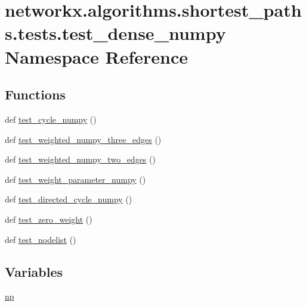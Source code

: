 \hypertarget{namespacenetworkx_1_1algorithms_1_1shortest__paths_1_1tests_1_1test__dense__numpy}{}\section{networkx.\+algorithms.\+shortest\+\_\+paths.\+tests.\+test\+\_\+dense\+\_\+numpy Namespace Reference}
\label{namespacenetworkx_1_1algorithms_1_1shortest__paths_1_1tests_1_1test__dense__numpy}
\subsection*{Functions}
\begin{DoxyCompactItemize}
\item 
def \hyperlink{namespacenetworkx_1_1algorithms_1_1shortest__paths_1_1tests_1_1test__dense__numpy_aaae6a644b378c13636ec77b107e6d745}{test\+\_\+cycle\+\_\+numpy} ()
\item 
def \hyperlink{namespacenetworkx_1_1algorithms_1_1shortest__paths_1_1tests_1_1test__dense__numpy_a06ad970350d4381cf18e387948069c8c}{test\+\_\+weighted\+\_\+numpy\+\_\+three\+\_\+edges} ()
\item 
def \hyperlink{namespacenetworkx_1_1algorithms_1_1shortest__paths_1_1tests_1_1test__dense__numpy_a3b48ca93c991f7dbdebabf7ea4900398}{test\+\_\+weighted\+\_\+numpy\+\_\+two\+\_\+edges} ()
\item 
def \hyperlink{namespacenetworkx_1_1algorithms_1_1shortest__paths_1_1tests_1_1test__dense__numpy_ae9db5554f475d7c812abf4722f004120}{test\+\_\+weight\+\_\+parameter\+\_\+numpy} ()
\item 
def \hyperlink{namespacenetworkx_1_1algorithms_1_1shortest__paths_1_1tests_1_1test__dense__numpy_a6c5043671d9b06c186836134f3d1e698}{test\+\_\+directed\+\_\+cycle\+\_\+numpy} ()
\item 
def \hyperlink{namespacenetworkx_1_1algorithms_1_1shortest__paths_1_1tests_1_1test__dense__numpy_a2d1fe6858c936136996f19acd50f2f7f}{test\+\_\+zero\+\_\+weight} ()
\item 
def \hyperlink{namespacenetworkx_1_1algorithms_1_1shortest__paths_1_1tests_1_1test__dense__numpy_a4eba2dc30d2ca282ed67c7f1ffb2eba5}{test\+\_\+nodelist} ()
\end{DoxyCompactItemize}
\subsection*{Variables}
\begin{DoxyCompactItemize}
\item 
\hyperlink{namespacenetworkx_1_1algorithms_1_1shortest__paths_1_1tests_1_1test__dense__numpy_abb9d5af225a317862ab036e6c9ac2093}{np}
\end{DoxyCompactItemize}


